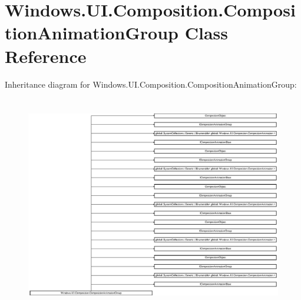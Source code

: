 \hypertarget{class_windows_1_1_u_i_1_1_composition_1_1_composition_animation_group}{}\section{Windows.\+U\+I.\+Composition.\+Composition\+Animation\+Group Class Reference}
\label{class_windows_1_1_u_i_1_1_composition_1_1_composition_animation_group}
Inheritance diagram for Windows.\+U\+I.\+Composition.\+Composition\+Animation\+Group\+:\begin{figure}[H]
\begin{center}
\leavevmode
\includegraphics[height=9.529984cm]{class_windows_1_1_u_i_1_1_composition_1_1_composition_animation_group}
\end{center}
\end{figure}
